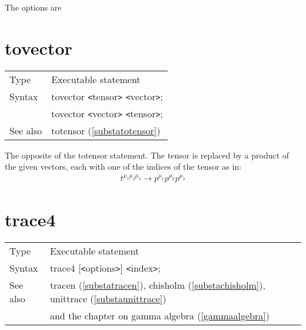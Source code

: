 \noindent The options are




\vspace{10mm}


\section{tovector}
\label{substatovector}

\noindent \begin{tabular}{ll}
Type & Executable statement\\
Syntax & tovector {\tt<}tensor{\tt>} {\tt<}vector{\tt>}; \\
       & tovector {\tt<}vector{\tt>} {\tt<}tensor{\tt>};
\\ See also & totensor (\ref{substatotensor})
\end{tabular} \vspace{4mm}

\noindent The opposite of the totensor 
statement. The tensor is replaced by a product of the given vectors, each 
with one of the indices of the tensor as in:
\begin{eqnarray}
    t^{\mu_1\mu_2\mu_3} \rightarrow p^{\mu_1}p^{\mu_2}p^{\mu_3} \nonumber
\end{eqnarray}\vspace{10mm}
\setcounter{equation}{7}


\section{trace4}
\label{substatrace}

\noindent \begin{tabular}{ll}
Type & Executable statement\\
Syntax & trace4 [{\tt<}options{\tt>}] {\tt<}index{\tt>}; \\
See also & tracen (\ref{substatracen}), chisholm (\ref{substachisholm}),
    unittrace (\ref{substaunittrace}) \\ &
    and the chapter on gamma algebra (\ref{gammaalgebra})
\end{tabular} \vspace{4mm}

